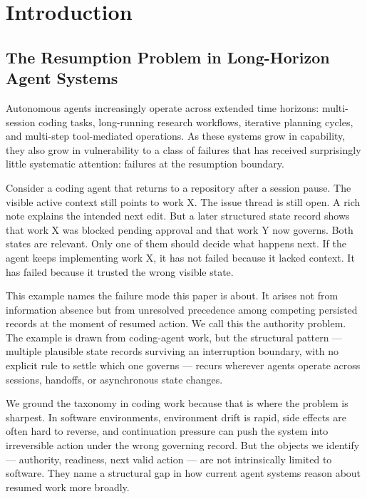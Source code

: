 \documentclass[a4paper,fleqn]{cas-sc}
\begin{document}
\maketitle

\section{Introduction}

\subsection{The Resumption Problem in Long-Horizon Agent Systems}

Autonomous agents increasingly operate across extended time horizons: multi-session coding tasks, long-running research workflows, iterative planning cycles, and multi-step tool-mediated operations. As these systems grow in capability, they also grow in vulnerability to a class of failures that has received surprisingly little systematic attention: failures at the resumption boundary.

Consider a coding agent that returns to a repository after a session pause. The visible active context still points to work X. The issue thread is still open. A rich note explains the intended next edit. But a later structured state record shows that work X was blocked pending approval and that work Y now governs. Both states are relevant. Only one of them should decide what happens next. If the agent keeps implementing work X, it has not failed because it lacked context. It has failed because it trusted the wrong visible state.

This example names the failure mode this paper is about. It arises not from information absence but from unresolved precedence among competing persisted records at the moment of resumed action. We call this the authority problem. The example is drawn from coding-agent work, but the structural pattern --- multiple plausible state records surviving an interruption boundary, with no explicit rule to settle which one governs --- recurs wherever agents operate across sessions, handoffs, or asynchronous state changes.

We ground the taxonomy in coding work because that is where the problem is sharpest. In software environments, environment drift is rapid, side effects are often hard to reverse, and continuation pressure can push the system into irreversible action under the wrong governing record. But the objects we identify --- authority, readiness, next valid action --- are not intrinsically limited to software. They name a structural gap in how current agent systems reason about resumed work more broadly.
\end{document}
